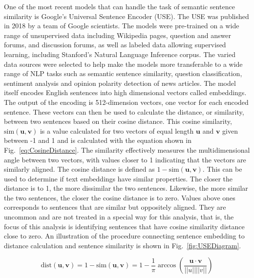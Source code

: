 One of the most recent models that can handle the task of semantic sentence similarity is Google’s Universal Sentence Encoder (USE). The USE was published in 2018 by a team of Google scientists. The models were pre-trained on a wide range of unsupervised data including Wikipedia pages, question and answer forums, and discussion forums, as well as labeled data allowing supervised learning, including Stanford’s Natural Language Inference corpus. The varied data sources were selected to help make the models more transferable to a wide range of NLP tasks such as semantic sentence similarity, question classification, sentiment analysis and opinion polarity detection of news articles. The model itself encodes English sentences into high dimensional vectors called embeddings. The output of the encoding is 512-dimension vectors, one vector for each encoded sentence. These vectors can then be used to calculate the distance, or similarity, between two sentences based on their cosine distance. This cosine similarity, $\mathrm{sim}(\mathbf{u}, \mathbf{v})$ is a value calculated for two vectors of equal length $\mathbf{u}$ and $\mathbf{v}$ given between -1 and 1 and is calculated with the equation shown in Fig.~\ref{eq:CosineDistance}. The similarity effectively measures the multidimensional angle between two vectors, with values closer to 1 indicating that the vectors are similarly aligned. The cosine distance is defined as  $1 - \mathrm{sim}(\mathbf{u}, \mathbf{v})$. This can be used to determine if  text embeddings have similar properties. The closer the distance is to 1, the more dissimilar the two sentences. Likewise, the more similar the two sentences, the closer the cosine distance is to zero. Values above ones corresponds to sentences that are similar but oppositely aligned. They are uncommon and are not treated in a special way for this analysis, that is, the focus of this analysis is identifying sentences that have cosine similarity distance close to zero. An illustration of the procedure connecting sentence embedding to distance calculation and sentence similarity is shown in Fig.~\ref{fig:USEDiagram}.

\begin{equation}
\mathrm{dist}(\mathbf{u}, \mathbf{v}) = 1 - \mathrm{sim}(\mathbf{u}, \mathbf{v}) = 1 - \frac{1}{\pi}\arccos\left (\frac{\mathbf{u}\cdot \mathbf{v}}{||u|| ||v||}\right)
\label{eq:CosineDistance}
\end{equation}

